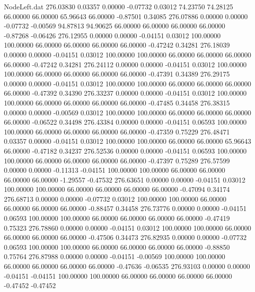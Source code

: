\begin{filecontents}{NodeLeft.dat}
 276.03830    0.03357    0.00000    -0.07732    0.03012   74.23750   74.28125   66.00000   66.00000   65.96643   66.00000   -0.87501    0.34085
 276.07886    0.00000    0.00000    -0.07732   -0.00569   94.87813   94.90625   66.00000   66.00000   66.00000   66.00000   -0.87268   -0.06426
 276.12955    0.00000    0.00000    -0.04151    0.03012  100.00000  100.00000   66.00000   66.00000   66.00000   66.00000   -0.47242    0.34281
 276.18039    0.00000    0.00000    -0.04151    0.03012  100.00000  100.00000   66.00000   66.00000   66.00000   66.00000   -0.47242    0.34281
 276.24112    0.00000    0.00000    -0.04151    0.03012  100.00000  100.00000   66.00000   66.00000   66.00000   66.00000   -0.47391    0.34389
 276.29175    0.00000    0.00000    -0.04151    0.03012  100.00000  100.00000   66.00000   66.00000   66.00000   66.00000   -0.47392    0.34390
 276.33237    0.00000    0.00000    -0.04151    0.03012  100.00000  100.00000   66.00000   66.00000   66.00000   66.00000   -0.47485    0.34458
 276.38315    0.00000    0.00000    -0.00569    0.03012  100.00000  100.00000   66.00000   66.00000   66.00000   66.00000   -0.06522    0.34498
 276.43384    0.00000    0.00000    -0.04151    0.06593  100.00000  100.00000   66.00000   66.00000   66.00000   66.00000   -0.47359    0.75229
 276.48471    0.03357    0.00000    -0.04151    0.03012  100.00000  100.00000   66.00000   66.00000   65.96643   66.00000   -0.47182    0.34237
 276.52536    0.00000    0.00000    -0.04151    0.06593  100.00000  100.00000   66.00000   66.00000   66.00000   66.00000   -0.47397    0.75289
 276.57599    0.00000    0.00000    -0.11313   -0.04151  100.00000  100.00000   66.00000   66.00000   66.00000   66.00000   -1.29557   -0.47532
 276.63651    0.00000    0.00000    -0.04151    0.03012  100.00000  100.00000   66.00000   66.00000   66.00000   66.00000   -0.47094    0.34174
 276.68713    0.00000    0.00000    -0.07732    0.03012  100.00000  100.00000   66.00000   66.00000   66.00000   66.00000   -0.88457    0.34458
 276.73776    0.00000    0.00000    -0.04151    0.06593  100.00000  100.00000   66.00000   66.00000   66.00000   66.00000   -0.47419    0.75323
 276.78860    0.00000    0.00000    -0.04151    0.03012  100.00000  100.00000   66.00000   66.00000   66.00000   66.00000   -0.47506    0.34473
 276.82935    0.00000    0.00000    -0.07732    0.06593  100.00000  100.00000   66.00000   66.00000   66.00000   66.00000   -0.88850    0.75764
 276.87988    0.00000    0.00000    -0.04151   -0.00569  100.00000  100.00000   66.00000   66.00000   66.00000   66.00000   -0.47636   -0.06535
 276.93103    0.00000    0.00000    -0.04151   -0.04151  100.00000  100.00000   66.00000   66.00000   66.00000   66.00000   -0.47452   -0.47452

\end{filecontents}
